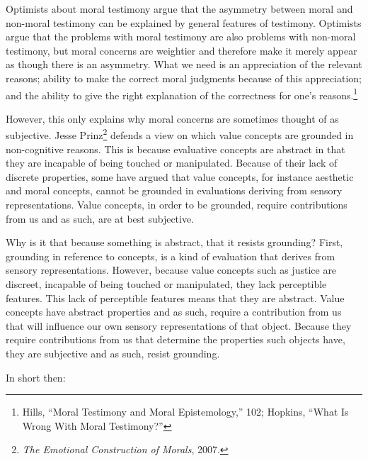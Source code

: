 \documentclass[phdthesis,12pt,final]{wuthesis}
\theoremstyle{definition}
\theoremstyle{definition}
\theoremstyle{definition}
\theoremstyle{definition}
\theoremstyle{remark}
\begin{document}
Optimists about moral testimony argue that the asymmetry between moral and non-moral testimony can be explained by general features of testimony. Optimists argue that the problems with moral testimony are also problems with non-moral testimony, but moral concerns are weightier and therefore make it merely appear as though there is an asymmetry. What we need is an appreciation of the relevant reasons; ability to make the correct moral judgments because of this appreciation; and the ability to give the right explanation of the correctness for one's reasons.\footnote{Hills, {``Moral Testimony and Moral Epistemology,''} 102; Hopkins, {``What {Is Wrong With Moral Testimony}?''}}

However, this only explains why moral concerns are sometimes thought of as subjective. Jesse Prinz\footnote{\emph{The {Emotional Construction} of {Morals}}, 2007.} defends a view on which value concepts are grounded in non-cognitive reasons. This is because evaluative concepts are abstract in that they are incapable of being touched or manipulated. Because of their lack of discrete properties, some have argued that value concepts, for instance aesthetic and moral concepts, cannot be grounded in evaluations deriving from sensory representations. Value concepts, in order to be grounded, require contributions from us and as such, are at best subjective.

Why is it that because something is abstract, that it resists grounding? First, grounding in reference to concepts, is a kind of evaluation that derives from sensory representations. However, because value concepts such as justice are discreet, incapable of being touched or manipulated, they lack perceptible features. This lack of perceptible features means that they are abstract. Value concepts have abstract properties and as such, require a contribution from us that will influence our own sensory representations of that object. Because they require contributions from us that determine the properties such objects have, they are subjective and as such, resist grounding.

In short then:

\begin{Shaded}
\begin{Highlighting}[]

\end{Highlighting}
\end{Shaded}
\end{document}
